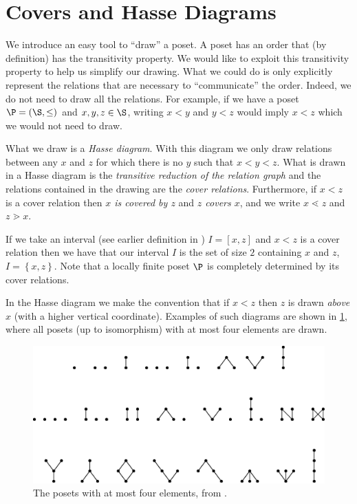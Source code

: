 \section{Covers and Hasse Diagrams}
\label{tree:poset:hasse}

We introduce an easy tool to ``draw'' a poset. A poset has an order that (by definition) has the transitivity property.
We would like to exploit this transitivity property to help us simplify our
drawing. What we could do is only explicitly represent the relations that are
necessary to ``communicate'' the order. Indeed, we do not need to draw
all the relations. For example, if we have a poset $\P = (\S, \le)$ and $x, y, z
\in \S$, writing $x < y$ and $y < z$ would imply $x < z$ which we would not need
to draw.


What we draw is a \emph{Hasse diagram}. With this diagram we only draw
relations between any $x$ and $z$ for which there is no $y$ such that $x < y <
z$.
What is drawn in a Hasse diagram is the \emph{transitive reduction
of the relation graph} and the relations contained in the drawing are the
\emph{cover relations}. Furthermore, if $x < z$ is a cover relation then
\emph{$x$ is covered by $z$} and \emph{$z$ covers $x$}, and we write $x \lessdot z$
and $z \gtrdot x$.


If we take an interval (see earlier definition in ) $I
= [x, z]$ and $x < z$ is a cover relation then we have that our interval $I$ is
the set of size $2$ containing $x$ and $z$, \ie $I = \left\{{x, z}\right\}$.
Note that a locally finite poset $\P$ is completely determined by its cover
relations.

In the Hasse diagram we make the convention that if $x < z$ then $z$ is drawn
\emph{above} $x$ (\ie with a higher vertical coordinate). Examples of such
diagrams are shown in \ref{fig:stanley:3-1}, where all posets (up to
isomorphism) with at most four elements are drawn.


\begin{figure}
	\centering
	\includegraphics[width=\textwidth]{fig/stanley/3-1}
	\caption{\label{fig:stanley:3-1} The posets with at most four elements,
from \citet*{Stanley:2011:ECV:2124415}.}
\end{figure}


